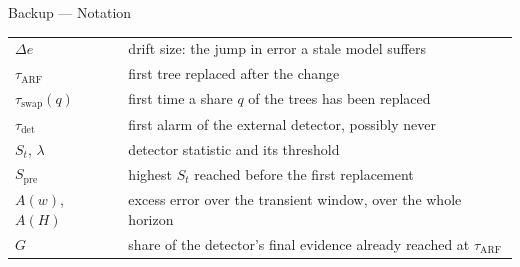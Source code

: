 \documentclass[aspectratio=169,11pt]{beamer}
\begin{document}
\begin{frame}{Backup --- Notation}
  \begin{center}
    \small
    \begin{tabular}{@{}ll@{}}
      \toprule
      $\Delta e$ & drift size: the jump in error a stale model suffers \\
      $\tau_{\mathrm{ARF}}$ & first tree replaced after the change \\
      $\tau_{\mathrm{swap}}(q)$ & first time a share $q$ of the trees has been replaced \\
      $\tau_{\mathrm{det}}$ & first alarm of the external detector, possibly never \\
      $S_t$, $\lambda$ & detector statistic and its threshold \\
      $S_{\mathrm{pre}}$ & highest $S_t$ reached before the first replacement \\
      $A(w)$, $A(H)$ & excess error over the transient window, over the whole horizon \\
      $G$ & share of the detector's final evidence already reached at $\tau_{\mathrm{ARF}}$ \\
      \bottomrule
    \end{tabular}
  \end{center}
\end{frame}
\end{document}
